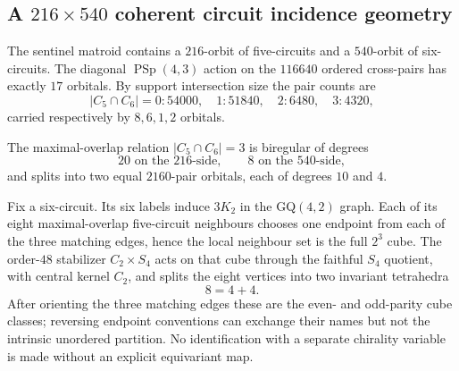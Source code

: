 \subsection{A $216\times540$ coherent circuit incidence geometry}
The sentinel matroid contains a $216$-orbit of five-circuits and a $540$-orbit of six-circuits.  The diagonal $\operatorname{PSp}(4,3)$ action on the $116640$ ordered cross-pairs has exactly $17$ orbitals.  By support intersection size the pair counts are
\[
|C_5\cap C_6|=0:54000,\quad 1:51840,\quad 2:6480,\quad 3:4320,
\]
carried respectively by $8,6,1,2$ orbitals.

The maximal-overlap relation $|C_5\cap C_6|=3$ is biregular of degrees
\[
\boxed{20\text{ on the }216\text{-side},\qquad 8\text{ on the }540\text{-side}},
\]
and splits into two equal $2160$-pair orbitals, each of degrees $10$ and $4$.

Fix a six-circuit.  Its six labels induce $3K_2$ in the GQ$(4,2)$ graph.  Each of its eight maximal-overlap five-circuit neighbours chooses one endpoint from each of the three matching edges, hence the local neighbour set is the full $2^3$ cube.  The order-$48$ stabilizer $C_2\times S_4$ acts on that cube through the faithful $S_4$ quotient, with central kernel $C_2$, and splits the eight vertices into two invariant tetrahedra
\[
\boxed{8=4+4}.
\]
After orienting the three matching edges these are the even- and odd-parity cube classes; reversing endpoint conventions can exchange their names but not the intrinsic unordered partition.  No identification with a separate chirality variable is made without an explicit equivariant map.
